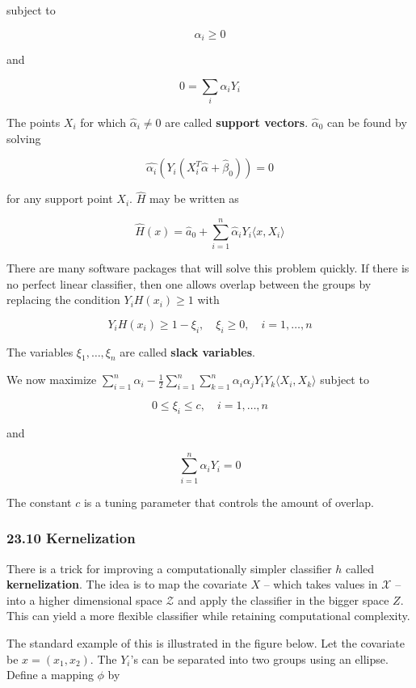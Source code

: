 subject to

\[ \alpha_i \geq 0 \]

and

\[ 0 = \sum_i \alpha_i Y_i \]

The points \(X_i\) for which \(\hat{\alpha}_i \neq 0\) are called
\textbf{support vectors}. \(\hat{\alpha}_0\) can be found by solving

\[ \hat{\alpha_i}(Y_i (X_i^T \hat{\alpha} + \hat{\beta}_0)) = 0\]

for any support point \(X_i\). \(\hat{H}\) may be written as

\[ \hat{H}(x) = \hat{a}_0 + \sum_{i=1}^n \hat{\alpha}_i Y_i \langle x, X_i \rangle \]

There are many software packages that will solve this problem quickly.
If there is no perfect linear classifier, then one allows overlap
between the groups by replacing the condition \(Y_i H(x_i) \geq 1\) with

\[ Y_i H(x_i) \geq 1 - \xi_i,
\quad \xi_i \geq 0,
\quad i = 1, \dots, n
\]

The variables \(\xi_1, \dots, \xi_n\) are called \textbf{slack
variables}.

We now maximize
\(\sum_{i=1}^n \alpha_i - \frac{1}{2} \sum_{i=1}^n \sum_{k=1}^n \alpha_i \alpha_j Y_i Y_k \langle X_i, X_k \rangle\)
subject to

\[ 0 \leq \xi_i \leq c, \quad i = 1, \dots, n \]

and

\[ \sum_{i=1}^n \alpha_i Y_i = 0 \]

The constant \(c\) is a tuning parameter that controls the amount of
overlap.

\subsubsection{23.10 Kernelization}\label{kernelization}

There is a trick for improving a computationally simpler classifier
\(h\) called \textbf{kernelization}. The idea is to map the covariate
\(X\) -- which takes values in \(\mathcal{X}\) -- into a higher
dimensional space \(\mathcal{Z}\) and apply the classifier in the bigger
space \(Z\). This can yield a more flexible classifier while retaining
computational complexity.

The standard example of this is illustrated in the figure below. Let the
covariate be \(x = (x_1, x_2)\). The \(Y_i\)'s can be separated into two
groups using an ellipse. Define a mapping \(\phi\) by

